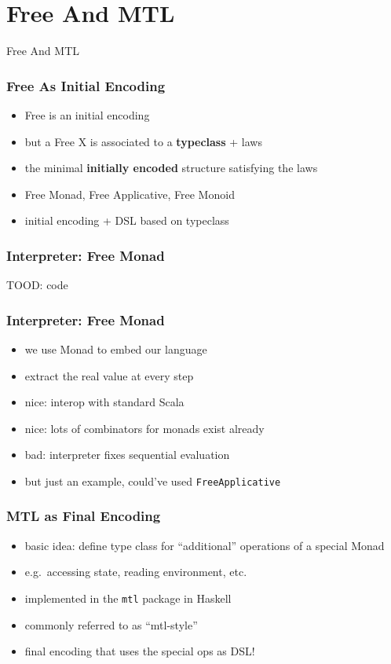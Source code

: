 \documentclass[aspectratio=169, hyperref={colorlinks, linkcolor=beamer@centricgreen}, urlcolor=links]{beamer}
\begin{document}
\section{Free And MTL}\label{sec:free-and-mtl}

\begin{frame}
  \begin{center}
    \Huge
    Free And MTL
  \end{center}
\end{frame}

\begin{frame}
  \frametitle{Free As Initial Encoding}
  \begin{itemize}
  \item Free is an initial encoding
  \item but a Free X is associated to a \textbf{typeclass} + laws
  \item the minimal \textbf{initially encoded} structure satisfying
    the laws
  \item Free Monad, Free Applicative, Free Monoid
  \item initial encoding + DSL based on typeclass
  \end{itemize}
\end{frame}

\begin{frame}
  \frametitle{Interpreter: Free Monad}
  TOOD: code
\end{frame}

\begin{frame}
  \frametitle{Interpreter: Free Monad}
  \begin{itemize}
  \item we use Monad to embed our language
  \item extract the real value at every step
  \item nice: interop with standard Scala
  \item nice: lots of combinators for monads exist already
  \item bad: interpreter fixes sequential evaluation
  \item but just an example, could've used \texttt{FreeApplicative}
  \end{itemize}
\end{frame}

\begin{frame}
  \frametitle{MTL as Final Encoding}
  \begin{itemize}
  \item basic idea: define type class for ``additional'' operations of a special Monad
  \item e.g.\ accessing state, reading environment, etc.
  \item implemented in the \texttt{mtl} package in Haskell
  \item commonly referred to as ``mtl-style''
  \item final encoding that uses the special ops as DSL!\@
  \end{itemize}
\end{frame}
\end{document}
